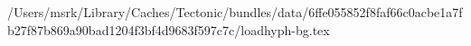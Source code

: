 /Users/msrk/Library/Caches/Tectonic/bundles/data/6ffe055852f8faf66c0acbe1a7fb27f87b869a90bad1204f3bf4d9683f597c7c/loadhyph-bg.tex